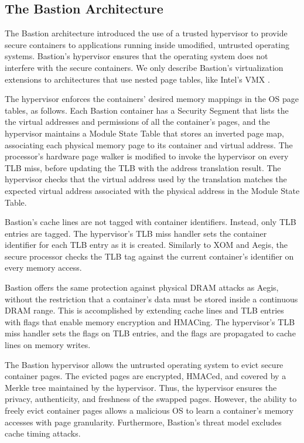 \subsection{The Bastion Architecture}

The Bastion architecture \cite{champagne2010bastion} introduced the use of a
trusted hypervisor to provide secure containers to applications running inside
umodified, untrusted operating systems. Bastion's hypervisor ensures that the
operating system does not interfere with the secure containers. We only
describe Bastion's virtualization extensions to architectures that use nested
page tables, like Intel's VMX \cite{uhlig2005vmx}.

The hypervisor enforces the containers' desired memory mappings in the OS page
tables, as follows. Each Bastion container has a Security Segment that lists
the the virtual addresses and permissions of all the container's pages, and the
hypervisor maintains a Module State Table that stores an inverted page map,
associating each physical memory page to its container and virtual address. The
processor's hardware page walker is modified to invoke the hypervisor on every
TLB miss, before updating the TLB with the address translation result. The
hypervisor checks that the virtual address used by the translation matches the
expected virtual address associated with the physical address in the Module
State Table.

Bastion's cache lines are not tagged with container identifiers. Instead, only
TLB entries are tagged. The hypervisor's TLB miss handler sets the container
identifier for each TLB entry as it is created. Similarly to XOM and Aegis, the
secure processor checks the TLB tag against the current container's identifier
on every memory access.

Bastion offers the same protection against physical DRAM attacks as Aegis,
without the restriction that a container's data must be stored inside a
continuous DRAM range. This is accomplished by extending cache lines and TLB
entries with flags that enable memory encryption and HMACing. The hypervisor's
TLB miss handler sets the flags on TLB entries, and the flags are propagated to
cache lines on memory writes.

The Bastion hypervisor allows the untrusted operating system to evict secure
container pages. The evicted pages are encrypted, HMACed, and covered by a
Merkle tree maintained by the hypervisor. Thus, the hypervisor ensures the
privacy, authenticity, and freshness of the swapped pages. However, the ability
to freely evict container pages allows a malicious OS to learn a container's
memory accesses with page granularity. Furthermore, Bastion's threat model
excludes cache timing attacks.

